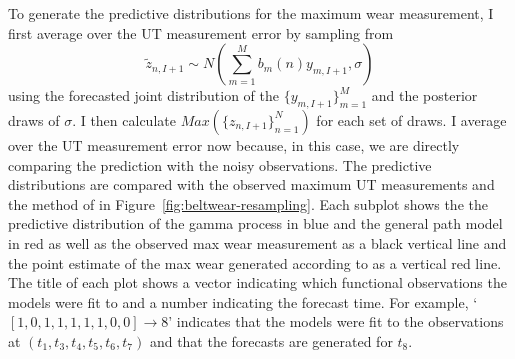 To generate the predictive distributions for the maximum wear measurement, I first average over the UT measurement error by sampling from
\begin{equation}
  \tilde{z}_{n, I + 1} \sim N \left( \sum^{M}_{m = 1}b_m(n)y_{m, I + 1}, \sigma \right)
\end{equation}
using the forecasted joint distribution of the $\{y_{m, I + 1}\}^M_{m = 1}$ and the posterior draws of $\sigma$. I then calculate $Max(\{z_{n, I + 1}\}^N_{n = 1})$ for each set of draws. I average over the UT measurement error now because, in this case, we are directly comparing the prediction with the noisy observations. The predictive distributions are compared with the observed maximum UT measurements and the method of \citet{webb_2020} in Figure~\ref{fig:beltwear-resampling}. Each subplot shows the the predictive distribution of the gamma process in blue and the general path model in red as well as the observed max wear measurement as a black vertical line and the point estimate of the max wear generated according to \citet{webb_2020} as a vertical red line. The title of each plot shows a vector indicating which functional observations the models were fit to and a number indicating the forecast time. For example, `$[1, 0, 1, 1, 1, 1, 1, 0, 0] \rightarrow 8$' indicates that the models were fit to the observations at $(t_1, t_3, t_4, t_5, t_6, t_7)$ and that the forecasts are generated for $t_8$.

